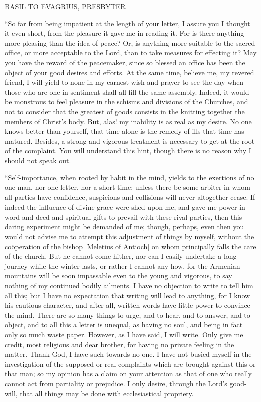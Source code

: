 BASIL TO EVAGRIUS, PRESBYTER

``So far from being impatient at the length of your letter, I
assure you I thought it even short, from the pleasure it gave me in
reading it. For is there anything more pleasing than the idea of
peace? Or, is anything more suitable to the sacred office, or more
acceptable to the Lord, than to take measures for effecting it? May
you have the reward of the peacemaker, since so blessed an office has
been the object of your good desires and efforts.
At the same time, believe me, my revered friend, I will yield to none
in my earnest wish and prayer to see the day when those who are one in
sentiment shall all fill the same assembly. Indeed, it would be
monstrous to feel pleasure in the schisms and divisions of the
Churches, and not to consider that the greatest of goods consists in
the knitting together the members of Christ's body. But, alas! my
inability is as real as my desire. No one knows better than yourself,
that time alone is the remedy of ills that time has matured. Besides,
a strong and vigorous treatment is necessary to get at the root of the
complaint. You will understand this hint, though there is no reason
why I should not speak out.

``Self-importance, when rooted by habit in the mind, yields to
the exertions of no one man, nor one letter, nor a short time; unless
there be some arbiter in whom all parties have confidence, suspicions
and collisions will never altogether cease. If indeed the influence of
divine grace were shed upon me, and gave me power in word and deed and
spiritual gifts to prevail with these rival parties, then this daring
experiment might be demanded of me; though, perhaps, even then you
would not advise me to attempt this adjustment of things by myself,
without the coöperation of the bishop [Meletius of Antioch] on whom
principally falls the care of the church. But he cannot come hither,
nor can I easily undertake a long journey while the winter lasts, or
rather I cannot any how, for the Armenian mountains will be soon
impassable even to the young and vigorous, to say nothing of my
continued bodily ailments. I have no objection to write to tell him
all this; but I have no expectation that writing will lead to
anything, for I know his cautious character, and after all, written
words have little power to convince the mind. There are so many things
to urge, and to hear, and to answer, and to object, and to all this a
letter is unequal, as having no soul, and being in fact only so much
waste paper. However, as I have said, I will write. Only give me
credit, most religious and dear brother, for having no private feeling
in the matter. Thank God, I have such towards no one. I have not
busied myself in the investigation of the supposed or real complaints
which are brought against this or that man; so my opinion has a claim
on your attention as that of one who really cannot act from partiality
or prejudice. I only desire, through the Lord's good-will, that all
things may be done with ecclesiastical propriety.

